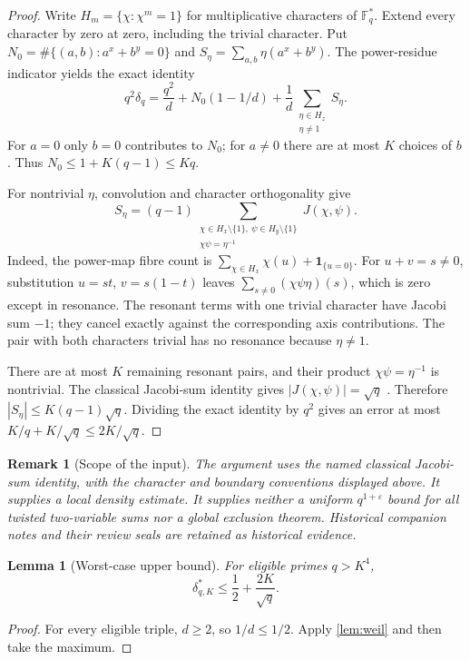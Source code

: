 \documentclass[11pt,a4paper]{article}
\newtheorem{lemma}[theorem]{Lemma}
\newtheorem{remark}[theorem]{Remark}
\begin{document}
\begin{proof}
Write $H_m=\{\chi:\chi^m=1\}$ for multiplicative characters of
$\mathbb F_q^*$. Extend every character by zero at zero, including
the trivial character. Put $N_0=\#\{(a,b):a^x+b^y=0\}$ and
$S_\eta=\sum_{a,b}\eta(a^x+b^y)$. The power-residue indicator yields
the exact identity
\[
 q^2\delta_q=\frac{q^2}{d}
       +N_0(1-1/d)+\frac1d\sum_{\substack{\eta\in H_z\\\eta\ne1}}S_\eta.
\]
For $a=0$ only $b=0$ contributes to $N_0$; for $a\ne0$ there are
at most $K$ choices of $b$. Thus $N_0\le1+K(q-1)\le Kq$.

For nontrivial $\eta$, convolution and character orthogonality give
\[
 S_\eta=(q-1)
 \sum_{\substack{\chi\in H_x\setminus\{1\},\
                 \psi\in H_y\setminus\{1\}\\
                 \chi\psi=\eta^{-1}}}J(\chi,\psi).
\]
Indeed, the power-map fibre count is
$\sum_{\chi\in H_x}\chi(u)+\mathbf1_{\{u=0\}}$.
For $u+v=s\ne0$, substitution $u=st$, $v=s(1-t)$ leaves
$\sum_{s\ne0}(\chi\psi\eta)(s)$, which is zero except in resonance.
The resonant terms with one trivial character have Jacobi sum $-1$;
they cancel exactly against the corresponding axis contributions.
The pair with both characters trivial has no resonance because
$\eta\ne1$.

There are at most $K$ remaining resonant pairs, and their product
$\chi\psi=\eta^{-1}$ is nontrivial. The classical Jacobi-sum
identity gives $|J(\chi,\psi)|=\sqrt q$
\cite[Ch.~8]{IrelandRosen}. Therefore
$|S_\eta|\le K(q-1)\sqrt q$. Dividing the exact identity by $q^2$
gives an error at most $K/q+K/\sqrt q\le2K/\sqrt q$.
\end{proof}

\begin{remark}[Scope of the input]
The argument uses the named classical Jacobi-sum identity, with
the character and boundary conventions displayed above. It supplies
a local density estimate. It supplies neither a uniform
$q^{1+\varepsilon}$ bound for all twisted two-variable sums nor a
global exclusion theorem. Historical companion notes and their
review seals are retained as historical evidence.
\end{remark}

\begin{lemma}[Worst-case upper bound]
\label{lem:worstcase}
For eligible primes $q>K^4$,
\[
 \delta_{q,K}^{*}\le\frac12+\frac{2K}{\sqrt q}.
\]
\end{lemma}
\begin{proof}
For every eligible triple, $d\ge2$, so $1/d\le1/2$.
Apply \cref{lem:weil} and then take the maximum.
\end{proof}
\end{document}
